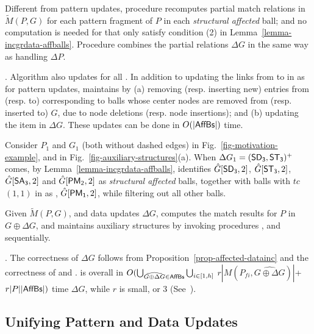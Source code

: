 Different from pattern updates, procedure \incmatch recomputes partial match relations in $\tilde{M}(P,G)$
for each pattern fragment of $P$ in each {\em structural affected} ball;
and no computation is needed for \affballsx that only satisfy condition (2) in Lemma~\ref{lemma-incgrdata-affballs}.
Procedure \comb combines the partial relations \wrt $\Delta G$ in the same way as handling $\Delta P$.


. Algorithm \incd also updates \fb for all \affballsx.
In addition to updating the links from \fs to \bs in \fb as for pattern updates,
\incd maintains \bs by
(a) removing (resp. inserting new) entries from (resp. to) \bs corresponding to balls whose center nodes are removed from (resp. inserted to) $G$, due to node deletions (resp. node insertions);
and (b) updating the  item in \bs \wrt $\Delta G$.
These updates can be done in $O(|{\mathsf{AffBs}}|)$ time.


\begin{example}
\label{exa-Ginc}
Consider $P_1$ and $G_1$ (both without dashed edges) in Fig.~\ref{fig-motivation-example}, and \fb in Fig.~\ref{fig-auxiliary-structures}(a).
When $\Delta G_1=({\mathsf{SD_3}},{\mathsf{ST_3}})^+$ comes,
by Lemma~\ref{lemma-incgrdata-affballs},
\identifyaffball identifies $\hat{G}{[{\mathsf{SD_3}}, 2]}$, $\hat{G}{[{\mathsf{ST_3}},2]}$, $\hat{G}{[{\mathsf{SA_3}}, 2]}$ and $\hat{G}{[{\mathsf{PM_2}}, 2]}$ as {\em structural affected} balls,
together with balls with $tc$ $(1, 1)$ in \fb as \affballsx, \ie $\hat{G}{[{\mathsf{PM_1}}, 2]}$, while filtering out all other balls.
\end{example}


 Given $\tilde{M}(P,G)$, \fb and data updates $\Delta G$,
\incd computes the match results for $P$ in $G \oplus \Delta G$, and maintains
auxiliary structures by invoking procedures \identifyaffball, \incmatch and \comb sequentially.


. The correctness of \incd \wrt $\Delta G$ follows from Proposition~\ref{prop-affected-datainc} and the correctness of \incmatch and \comb.
\incd is overall in
$O(\bigcup_{\widehat{G\oplus\Delta G}\in {\ensuremath {\mathsf{AffBs}}}}\bigcup_{i\in[1,h]}$ $r|M(P_{fi}, \widehat{G\oplus\Delta G})|$+$r|P||{\mathsf{AffBs}}|)$ time \wrt $\Delta G$, while $r$ is small,  or 3  (See~\cite{fullvldb18}).



\subsection{Unifying Pattern and Data Updates}
\label{subsec-completePG}

